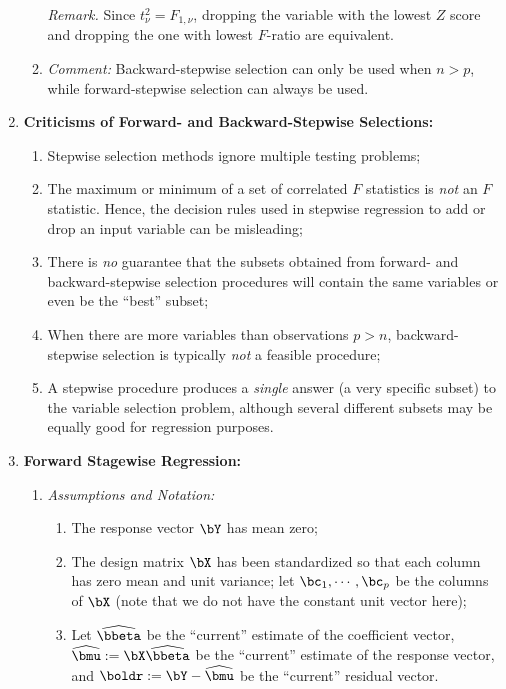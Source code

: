 \documentclass[12pt]{article}
\begin{document}
\begin{enumerate}[label=\textbf{\arabic*.}]
\begin{enumerate}
		\textit{Remark.} Since $t^2_{\nu} = F_{1, \nu}$, dropping the variable with the lowest $Z$ score and dropping the one with lowest $F$-ratio are equivalent. 
		
		\item \textit{Comment:} Backward-stepwise selection can only be used when $n > p$,  while forward-stepwise selection can always be used. 
	\end{enumerate}
	
	\item \textbf{Criticisms of Forward- and Backward-Stepwise Selections:}
	\begin{enumerate}
		\item Stepwise selection methods ignore multiple testing problems; 
		\item The maximum or minimum of a set of correlated $F$ statistics is \emph{not} an $F$ statistic. Hence, the decision rules used in stepwise regression to add or drop an input variable can be misleading; %
		\item There is \emph{no} guarantee that the subsets obtained from forward- and backward-stepwise selection procedures will contain the same variables or even be the ``best'' subset; 
		\item When there are more variables than observations $p > n$, backward-stepwise selection is typically \emph{not} a feasible procedure; 
		\item A stepwise procedure produces a \emph{single} answer (a very specific subset) to the variable selection problem, although several different subsets may be equally good for regression purposes. 
	\end{enumerate}
	
	\item \textbf{Forward Stagewise Regression:} 
	\begin{enumerate}
		\item \textit{Assumptions and Notation:}
		\begin{enumerate}
			\item The response vector $\bY$ has mean zero; 
			\item The design matrix $\bX$ has been standardized so that each column has zero mean and unit variance; let $\bc_1, \cdots, \bc_p$ be the columns of $\bX$ (note that we do not have the constant unit vector here); 
			\item Let $\widehat{\bbeta}$ be the ``current'' estimate of the coefficient vector, $\widehat{\bmu} := \bX \widehat{\bbeta}$ be the ``current'' estimate of the response vector, and $\boldr := \bY - \widehat{\bmu}$ be the ``current'' residual vector. 
		\end{enumerate}
		

\end{enumerate}
\end{enumerate}
\end{document}
